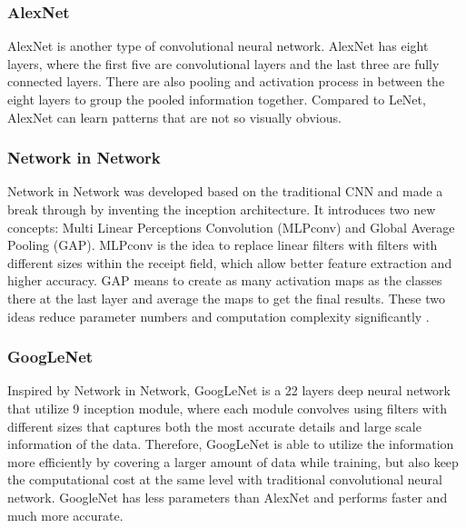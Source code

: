 \subsubsection{AlexNet}
AlexNet is another type of convolutional neural network. AlexNet has eight layers, where the first five are convolutional layers and the last three are fully connected layers. There are also pooling and activation process in between the eight layers to group the pooled information together. Compared to LeNet, AlexNet can learn patterns that are not so visually obvious\cite{AlexNet}.

\subsubsection{Network in Network}
Network in Network was developed based on the traditional CNN and made a break through by inventing the inception architecture. It introduces two new concepts: Multi Linear Perceptions Convolution (MLPconv) and Global Average Pooling (GAP). MLPconv is the idea to replace linear filters with filters with different sizes within the receipt field, which allow better feature extraction and higher accuracy. GAP means to create as many activation maps as the classes there at the last layer and average the maps to get the final results. These two ideas reduce parameter numbers and computation complexity significantly \cite{nin}.

\subsubsection{GoogLeNet}
Inspired by Network in Network, GoogLeNet is a 22 layers deep neural network that utilize 9 inception module, where each module convolves using filters with different sizes that captures both the most accurate details and large scale information of the data. Therefore, GoogLeNet is able to utilize the information more efficiently by covering a larger amount of data while training, but also keep the computational cost at the same level with traditional convolutional neural network.  GoogleNet has less parameters than AlexNet and performs faster and much more accurate\cite{GoogleNet}.



